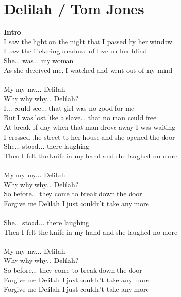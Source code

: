 \section{Delilah / Tom Jones}\label{sec:delilah}
\Eminor
\Bseven
\EmajorEasy
\Eseven
\Aminor
\Dseven
\Gmajor
\Gseven
\Cmajor
\Aseven


\textbf{Intro} \\
I saw the light on the night that I passed by her window\\
I saw the flickering shadows of love on her blind\\
She... was... my woman\\
As she deceived me, I watched and went out of my mind\\
\\
My my my... Delilah\\
Why why why... Delilah?\\
I... could see... that girl was no good for me\\
But I was lost like a slave... that no man could free \\
At break of day when that man drove away I was waiting\\
I crossed the street to her house and she opened the door\\
She... stood... there laughing\\
Then I felt the knife in my hand and she laughed no more\\
\\
My my my... Delilah\\
Why why why... Delilah?\\
So before... they come to break down the door\\
Forgive me Delilah I just couldn’t take any more \\
   \\
She... stood... there laughing\\
Then I felt the knife in my hand and she laughed no more\\
\\
My my my... Delilah\\
Why why why... Delilah?\\
So before... they come to break down the door\\
Forgive me Delilah I just couldn’t take any more\\
Forgive me Delilah I just couldn’t take any more \\


